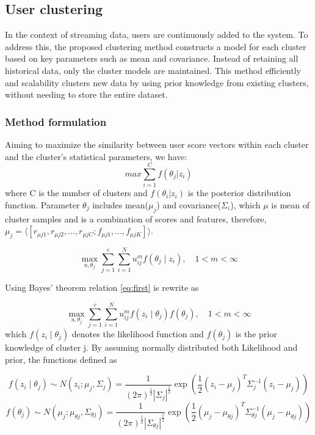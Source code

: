 \documentclass{article}
\begin{document}
\subsection{User clustering}
In the context of streaming data, users are continuously added to the system. To address this, the proposed clustering method constructs a model for each cluster based on key parameters such as mean and covariance. Instead of retaining all historical data, only the cluster models are maintained. This method efficiently and scalability clusters new data by using prior knowledge from existing clusters, without needing to store the entire dataset.

\subsubsection{Method formulation}

Aiming to maximize the similarity between user score vectors within each cluster and the cluster's statistical parameters, we have:
\begin{equation}
    max \sum_{i=1}^{C} f(\theta_j| z_i)
\end{equation}
where C is the number of clusters and $f(\theta_i|z_i)$ is the posterior distribution function. Parameter $\theta_j$ includes mean($\mu_j$) and covariance($\Sigma_i$), which $\mu$ is mean of cluster samples and is a combination of scores and features, therefore, $\mu_j = \langle [r_{\mu j1}, r_{\mu j2}, \ldots, r_{\mu jC}; f_{\mu j1}, \ldots, f_{\mu jK}] \rangle $.

\begin{equation}\label{eq:first}
    \max_{u, \theta_j} \sum_{j=1}^{c} \sum_{i=1}^{N} u_{ij}^{m} f(\theta_j \mid z_i), \quad 1 < m < \infty
\end{equation}

Using Bayes' theorem relation \ref{eq:first} is rewrite as 

\begin{equation}\label{eq:bayes}
    \max_{u, \theta_j} \sum_{j=1}^{c} \sum_{i=1}^{N} u_{ij}^{m} f( z_i \mid \theta_j) f(\theta_j), \quad 1 < m < \infty
\end{equation}
which $f( z_i \mid \theta_j)$ denotes the likelihood function and $f(\theta_j)$ is the prior knowledge of cluster j.
By assuming normally distributed both Likelihood and prior, the functions defined as

\begin{equation} \label{eq:f likelihood}
    f(z_i \mid \theta_j) \sim N(z_i; \mu_j, \Sigma_j) = \frac{1}{(2\pi)^{\frac{1}{2}}|\Sigma_j|^{\frac{1}{2}}} \exp \left(\frac{1}{2} (z_i - \mu_j)^T \Sigma_j^{-1} (z_i - \mu_j) \right)
\end{equation}
\begin{equation} \label{eq:f theta prior}
    f(\theta_j) \sim N(\mu_j; \mu_{\theta j}, \Sigma_{\theta j}) = \frac{1}{(2\pi)^{\frac{1}{2}}|\Sigma_{\theta j}|^{\frac{1}{2}}} \exp \left(\frac{1}{2} (\mu_j - \mu_{\theta j})^T \Sigma_{\theta j}^{-1} (\mu_j - \mu_{\theta j}) \right)
\end{equation}
\end{document}
